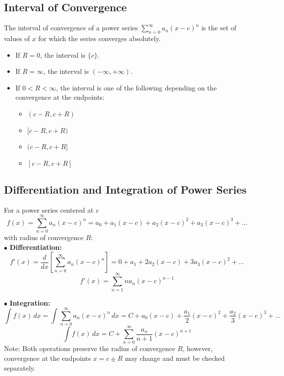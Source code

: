 \documentclass[a4paper,11pt]{article}
\begin{document}


\subsection{Interval of Convergence}

\begin{tcolorbox}
    The interval of convergence of a power series $\textstyle \sum_{n=0}^{\infty} a_n (x - c)^n$ is the set of values of $x$ for which the series converges absolutely.
    \begin{itemize}
        \item If $R = 0$, the interval is $\{ c \}$.
        \item If $R = \infty$, the interval is $(-\infty, +\infty)$.
        \item If $0 < R < \infty$, the interval is one of the following depending on the convergence at the endpoints:
        \begin{multicols}{4}
            \begin{itemize}[label=$\circ$]
                \item $(c - R, c + R)$
                \item $[c - R, c + R)$
                \item $(c - R, c + R]$
                \item $[c - R, c + R]$
            \end{itemize}
        \end{multicols}
    \end{itemize}
\end{tcolorbox}




\subsection{Differentiation and Integration of Power Series}

\begin{tcolorbox}
    For a power series centered at $c$
    \[ f(x) = \sum_{n=0}^{\infty} a_n (x - c)^n = a_0 + a_1 (x - c) + a_2 (x - c)^2 + a_3 (x - c)^3 + \dots \] 
    with radius of convergence $R$: \\[10pt]
    $\bullet$ \textbf{Differentiation:}
    \[
    f'(x) = \frac{d}{dx} \left[ \sum_{n=0}^{\infty} a_n (x - c)^n  \right] = 0 + a_1 + 2 a_2 (x - c) + 3 a_3 (x - c)^2 + \dots
    \]
    \[ \boxed{f'(x) = \sum_{n=1}^{\infty} na_n(x-c)^{n-1}} \]
    
    $\bullet$ \textbf{Integration:}
    \[
    \int f(x) \, dx = \int \sum_{n=0}^{\infty} a_n (x - c)^n \, dx = C + a_0 (x - c) + \frac{a_1}{2} (x - c)^2 + \frac{a_2}{3} (x - c)^3 + \dots 
    \]
    \[ \boxed{\int f(x) \, dx = C + \sum_{n=0}^{\infty} \frac{a_n}{n+1} (x-c)^{n+1}} \]
    Note: Both operations preserve the radius of convergence $R$, however, convergence at the endpoints $x = c \pm R$ may change and must be checked separately.
\end{tcolorbox}
\end{document}
